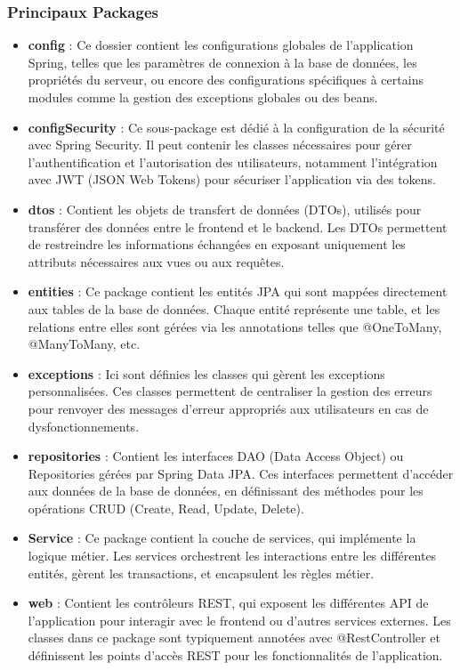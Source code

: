 \documentclass[12pt,a4paper]{report}
\begin{document}
\subsubsection{Principaux Packages}

\begin{itemize}
    \item \textbf{config} : Ce dossier contient les configurations globales de l'application Spring, telles que les paramètres de connexion à la base de données, les propriétés du serveur, ou encore des configurations spécifiques à certains modules comme la gestion des exceptions globales ou des beans.
    
    \item \textbf{configSecurity} : Ce sous-package est dédié à la configuration de la sécurité avec Spring Security. Il peut contenir les classes nécessaires pour gérer l'authentification et l'autorisation des utilisateurs, notamment l'intégration avec JWT (JSON Web Tokens) pour sécuriser l'application via des tokens.
    
    \item \textbf{dtos} : Contient les objets de transfert de données (DTOs), utilisés pour transférer des données entre le frontend et le backend. Les DTOs permettent de restreindre les informations échangées en exposant uniquement les attributs nécessaires aux vues ou aux requêtes.
    
    \item \textbf{entities} : Ce package contient les entités JPA qui sont mappées directement aux tables de la base de données. Chaque entité représente une table, et les relations entre elles sont gérées via les annotations telles que @OneToMany, @ManyToMany, etc.
    
    \item \textbf{exceptions} : Ici sont définies les classes qui gèrent les exceptions personnalisées. Ces classes permettent de centraliser la gestion des erreurs pour renvoyer des messages d'erreur appropriés aux utilisateurs en cas de dysfonctionnements.
    
    \item \textbf{repositories} : Contient les interfaces DAO (Data Access Object) ou Repositories gérées par Spring Data JPA. Ces interfaces permettent d'accéder aux données de la base de données, en définissant des méthodes pour les opérations CRUD (Create, Read, Update, Delete).
    
    \item \textbf{Service} : Ce package contient la couche de services, qui implémente la logique métier. Les services orchestrent les interactions entre les différentes entités, gèrent les transactions, et encapsulent les règles métier.
    
    \item \textbf{web} : Contient les contrôleurs REST, qui exposent les différentes API de l'application pour interagir avec le frontend ou d'autres services externes. Les classes dans ce package sont typiquement annotées avec @RestController et définissent les points d'accès REST pour les fonctionnalités de l'application.
\end{itemize}
\end{document}
